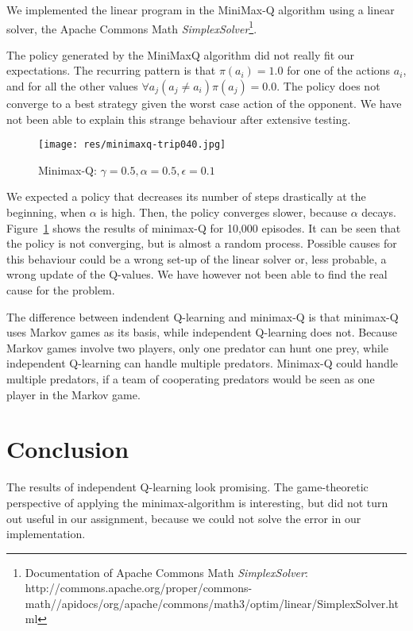 \documentclass{article}
\begin{document}
We implemented the linear program in the MiniMax-Q algorithm using a linear solver, the Apache Commons Math \emph{SimplexSolver}\footnote{Documentation of Apache Commons Math \emph{SimplexSolver}: http://commons.apache.org/proper/commons-math//apidocs/org/apache/commons/math3/optim/linear/SimplexSolver.html}.

The policy generated by the MiniMaxQ algorithm did not really fit our expectations. The recurring pattern is that $\pi(a_i) = 1.0$ for one of the actions $a_i$, and for all the other values $\forall a_j (a_j \neq a_i) \pi(a_j) = 0.0$. The policy does not converge to a best strategy given the worst case action of the opponent. We have not been able to explain this strange behaviour after extensive testing. 

\begin{figure}[!h]
\texttt{[image: res/minimaxq-trip040.jpg]}
\caption{Minimax-Q: $\gamma=0.5, \alpha = 0.5, \epsilon = 0.1$}
\label{fig:minimaxq}
\end{figure}

We expected a policy that decreases its number of steps drastically at the beginning, when $\alpha$ is high. Then, the policy converges slower, because $\alpha$ decays. Figure~\ref{fig:minimaxq} shows the results of minimax-Q for 10,000 episodes. It can be seen that the policy is not converging, but is almost a random process. Possible causes for this behaviour could be a wrong set-up of the linear solver or, less probable, a wrong update of the Q-values. We have however not been able to find the real cause for the problem. %

The difference between indendent Q-learning and minimax-Q is that minimax-Q uses Markov games as its basis, while independent Q-learning does not. Because Markov games involve two players, only one predator can hunt one prey, while independent Q-learning can handle multiple predators. Minimax-Q could handle multiple predators, if a team of cooperating predators would be seen as one player in the Markov game.
\section{Conclusion}
The results of independent Q-learning look promising. The game-theoretic perspective of applying the minimax-algorithm is interesting, but did not turn out useful in our assignment, because we could not solve the error in our implementation.
\end{document}
